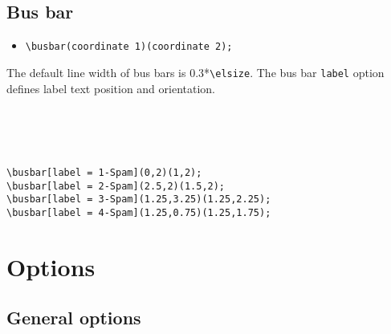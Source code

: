 \documentclass[a4]{article}
\begin{document}
\subsection{Bus bar}
\begin{itemize}
\item[]\color{myblue}\verb+\busbar(coordinate 1)(coordinate 2);+ 
\end{itemize}
The default line width of bus bars is 0.3*\verb+\elsize+. The bus bar \verb+label+ option defines label text position and orientation. 
\begin{examplebox}
\\ \ \\ \ \\
\begin{minipage}{0.4\textwidth}
\end{minipage}
\begin{minipage}{0.45\textwidth}
\begin{verbatim}
\busbar[label = 1-Spam](0,2)(1,2);
\busbar[label = 2-Spam](2.5,2)(1.5,2);
\busbar[label = 3-Spam](1.25,3.25)(1.25,2.25);
\busbar[label = 4-Spam](1.25,0.75)(1.25,1.75);
\end{verbatim}
\end{minipage}
\end{examplebox}
\newpage
\section{Options}
\subsection{General options}
\end{document}
